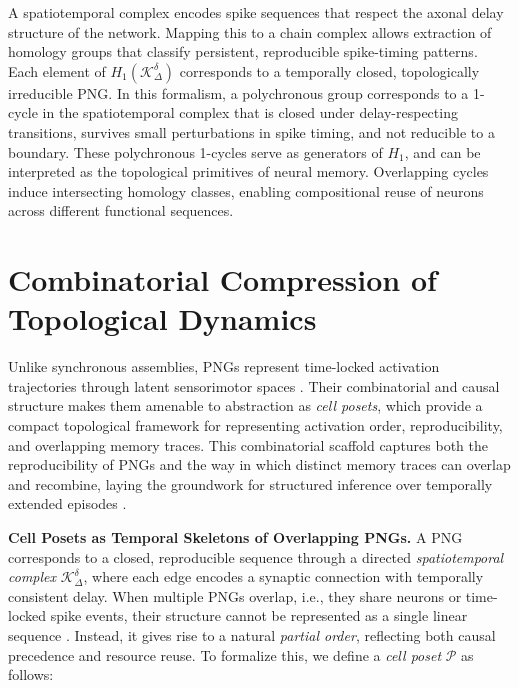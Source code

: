\documentclass[lettersize,journal]{IEEEtran}
\begin{document}
\begin{tcolorbox}[colback=blue!5, colframe=blue!60!black, title=From Spatiotemporal Complexes to Chain Complexes: a Topological View of Polychronous Neural Groups]
A spatiotemporal complex encodes spike sequences that respect the axonal delay structure of the network. Mapping this to a chain complex allows extraction of homology groups that classify persistent, reproducible spike-timing patterns. Each element of \( H_1(\mathcal{K}_\Delta^\delta) \) corresponds to a temporally closed, topologically irreducible PNG. In this formalism, a polychronous group  corresponds to a 1-cycle in the spatiotemporal complex that is closed under delay-respecting transitions, survives small perturbations in spike timing, and not reducible to a boundary. These polychronous 1-cycles serve as generators of \( H_1 \), and can be interpreted as the topological primitives of neural memory. Overlapping cycles induce intersecting homology classes, enabling compositional reuse of neurons across different functional sequences.
\end{tcolorbox}


\section{Combinatorial Compression of Topological Dynamics}
\label{sec:combi}

Unlike synchronous assemblies, PNGs represent time-locked activation trajectories through latent sensorimotor spaces \cite{sohn2021network}. Their combinatorial and causal structure makes them amenable to abstraction as \emph{cell posets}, which provide a compact topological framework for representing activation order, reproducibility, and overlapping memory traces. This combinatorial scaffold captures both the reproducibility of PNGs and the way in which distinct memory traces can overlap and recombine, laying the groundwork for structured inference over temporally extended episodes \cite{ayzenberg2025sheaf}.


\noindent\textbf{Cell Posets as Temporal Skeletons of Overlapping PNGs.}
A PNG corresponds to a closed, reproducible sequence through a directed \emph{spatiotemporal complex} \( \mathcal{K}_\Delta^\delta \), where each edge encodes a synaptic connection with temporally consistent delay. When multiple PNGs overlap, i.e., they share neurons or time-locked spike events, their structure cannot be represented as a single linear sequence \cite{bredon1997sheaf}. Instead, it gives rise to a natural \emph{partial order}, reflecting both causal precedence and resource reuse.
To formalize this, we define a \emph{cell poset} \( \mathcal{P} \) as follows:
\end{document}
